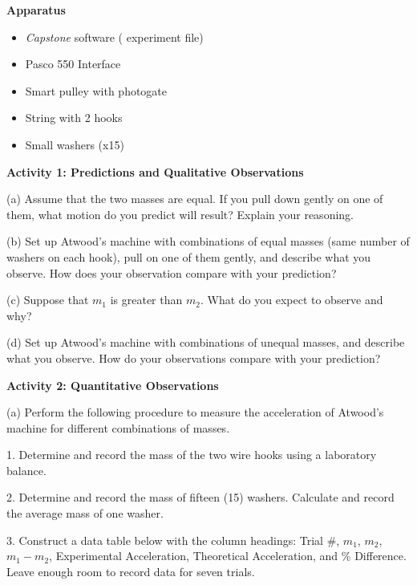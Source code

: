 \textbf{Apparatus} 

\begin{itemize}
\item \textit{Capstone} software ( experiment file)
\item Pasco 550 Interface
\item Smart pulley with photogate 
\item String with 2 hooks 
\item Small washers (x15)
\end{itemize}
\textbf{Activity 1: Predictions and Qualitative Observations} 

(a) Assume that the two masses are equal. If you pull down gently on one of
them, what motion do you predict will result? Explain your reasoning.
\vspace{20mm}

(b) Set up Atwood's machine with combinations of equal masses (same number of
washers on each hook), pull on one of them gently, and describe what you observe.
How does your observation compare with your prediction?
\vspace{20mm}

(c) Suppose that \( m_{1} \) is greater than \( m_{2} \). What do you expect
to observe and why?
\vspace{20mm}

\pagebreak[2] 
(d) Set up Atwood's machine with combinations of unequal masses, and describe
what you observe. How do your observations compare with your prediction?
\vspace{20mm}

\textbf{Activity 2: Quantitative Observations }

(a) Perform the following procedure to measure the acceleration of Atwood's
machine for different combinations of masses. 

1. Determine and record the mass of the two wire hooks using a laboratory balance.
\vspace{10mm}

2. Determine and record the mass of fifteen (15) washers. Calculate and record
the average mass of one washer.
\vspace{10mm}

3. Construct a data table below with the column headings: Trial \#, \( m_{1} \),
\( m_{2} \), \( m_{1}  - m_{2} \), Experimental Acceleration, Theoretical
Acceleration, and \% Difference. Leave enough room to record data for seven
trials.
\vspace{50mm}

